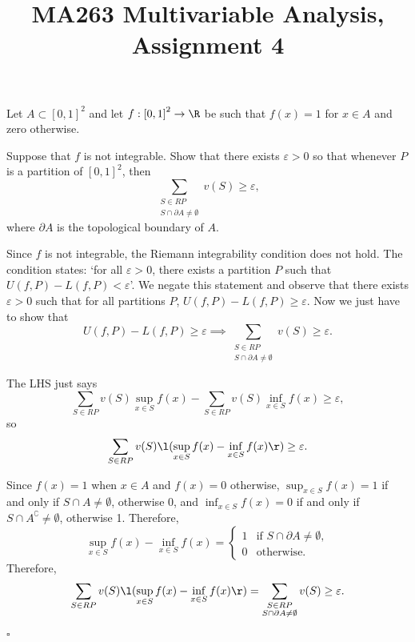 \documentclass[a4paper]{article}
\title{\vspace*{-4ex}MA263 Multivariable Analysis, Assignment 4}
\begin{document}
\maketitle

\setlength{\parindent}{0em}
\setlength{\parskip}{1em}


\begin{questionbody}
Let $A \subset {[0, 1]}^2$ and let $f : {[0, 1]}^2 \to \R$ be such that $f(x) = 1$ for $x \in A$ and zero otherwise.

Suppose that $f$ is not integrable. Show that there exists $\varepsilon > 0$ so that whenever $P$ is a partition of ${[0, 1]}^2$, then \[
\sum_{\substack{S \in RP \\ S \cap \partial A \ne \emptyset}} v(S) \ge \varepsilon,
\] where $\partial A$ is the topological boundary of $A$.
\end{questionbody}

Since $f$ is not integrable, the Riemann integrability condition does not hold. The condition states: `for all $\varepsilon > 0$, there exists a partition $P$ such that $U(f, P) - L(f, P) < \varepsilon$'. We negate this statement and observe that there exists $\varepsilon > 0$ such that for all partitions $P$, $U(f, P) - L(f, P) \ge \varepsilon$. Now we just have to show that \[
U(f, P) - L(f, P) \ge \varepsilon \implies \sum_{\substack{S \in RP \\ S \cap \partial A \ne \emptyset}} v(S) \ge \varepsilon.
\]

The LHS just says \[
\sum_{S \in RP} v(S) \sup_{x \in S} f(x) - \sum_{S \in RP} v(S) \inf_{x \in S} f(x) \ge \varepsilon,
\] so \[
\sum_{S \in RP} v(S) \l( \sup_{x \in S} f(x) - \inf_{x \in S} f(x) \r) \ge \varepsilon.
\]

Since $f(x) = 1$ when $x \in A$ and $f(x) = 0$ otherwise, $\sup_{x \in S} f(x) = 1$ if and only if $S \cap A \ne \emptyset$, otherwise 0, and $\inf_{x \in S} f(x) = 0$ if and only if $S \cap A^\complement \ne \emptyset$, otherwise 1. Therefore, \[
\sup_{x \in S} f(x) - \inf_{x \in S} f(x) = \begin{cases}
1 & \text{if } S \cap \partial A \ne \emptyset, \\
0 & \text{otherwise}.
\end{cases}
\] Therefore, \[
\sum_{S \in RP} v(S) \l( \sup_{x \in S} f(x) - \inf_{x \in S} f(x) \r) = \sum_{\substack{S \in RP \\ S \cap \partial A \ne \emptyset}} v(S) \ge \varepsilon.
\]
\hfill $\square$
\end{document}

